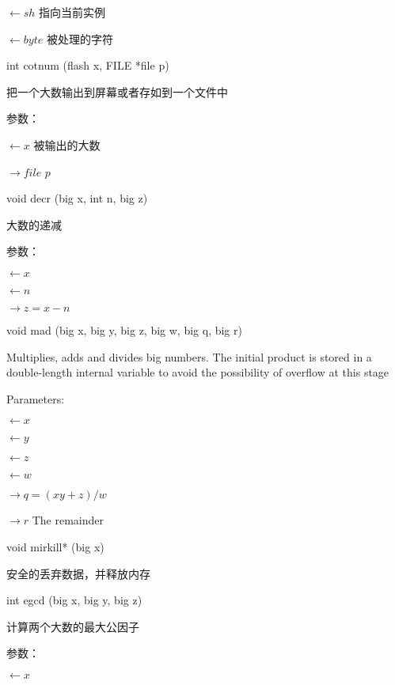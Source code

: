 $\leftarrow sh$ 指向当前实例

$\leftarrow byte$ 被处理的字符



int cotnum (flash x, FILE *file  p)

把一个大数输出到屏幕或者存如到一个文件中

参数：

$\leftarrow x$ 被输出的大数

$\rightarrow file$ $p$




void decr (big x, int n, big z)

大数的递减

参数：

$\leftarrow x$

$\leftarrow n$

$\rightarrow z =x-n$




void mad (big x, big y, big z, big w, big q, big r)

Multiplies, adds and divides big numbers. The initial product is stored in a double-length internal variable
to avoid the possibility of overflow at this stage

Parameters:

$\leftarrow x$

$\leftarrow y$

$\leftarrow z$

$\leftarrow w$

$\rightarrow q =(xy+z)/w$

$\rightarrow r$ The remainder




void mirkill* (big x)

安全的丢弃数据，并释放内存




int egcd (big x, big y, big z)

计算两个大数的最大公因子

参数：

$\leftarrow x$
